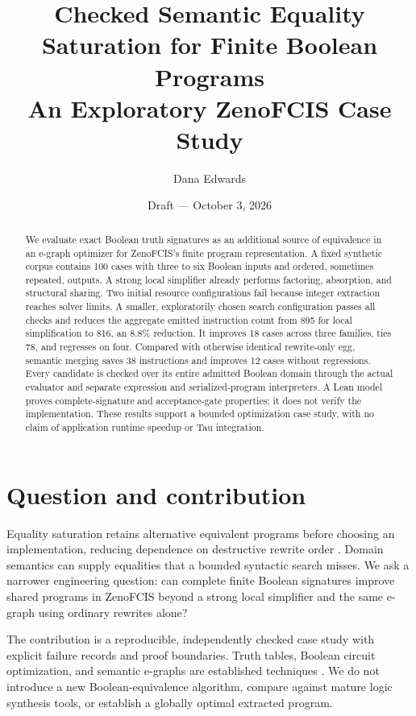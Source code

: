 \documentclass[11pt]{article}
\title{Checked Semantic Equality Saturation for Finite Boolean Programs\\
  \large An Exploratory ZenoFCIS Case Study}
\author{Dana Edwards}
\date{Draft --- October 3, 2026}
\begin{document}
\maketitle

\begin{abstract}
We evaluate exact Boolean truth signatures as an additional source of
equivalence in an e-graph optimizer for ZenoFCIS's finite program representation.
A fixed synthetic corpus contains 100 cases with three to six Boolean inputs
and ordered, sometimes repeated, outputs. A strong local simplifier already
performs factoring, absorption, and structural sharing. Two initial resource
configurations fail because integer extraction reaches solver limits. A smaller,
exploratorily chosen search configuration passes all checks and reduces the
aggregate emitted instruction count from 895 for local simplification to 816,
an 8.8\% reduction. It improves 18 cases across three families, ties 78, and
regresses on four. Compared with otherwise identical rewrite-only egg, semantic
merging saves 38 instructions and improves 12 cases without regressions.
Every candidate is checked over its entire admitted Boolean domain through the
actual evaluator and separate expression and serialized-program interpreters.
A Lean model proves complete-signature and acceptance-gate properties; it does
not verify the implementation. These results support a bounded optimization
case study, with no claim of application runtime speedup or Tau integration.
\end{abstract}

\section{Question and contribution}

Equality saturation retains alternative equivalent programs before choosing an
implementation, reducing dependence on destructive rewrite order
\cite{tate,egg}. Domain semantics can supply equalities that a bounded syntactic
search misses. We ask a narrower engineering question: can complete finite
Boolean signatures improve shared programs in ZenoFCIS beyond a strong local
simplifier and the same e-graph using ordinary rewrites alone?

The contribution is a reproducible, independently checked case study with
explicit failure records and proof boundaries. Truth tables, Boolean circuit
optimization, and semantic e-graphs are established techniques
\cite{bryant,aig,boole,semantic}. We do not introduce a new Boolean-equivalence
algorithm, compare against mature logic synthesis tools, or establish a globally
optimal extracted program.
\end{document}

